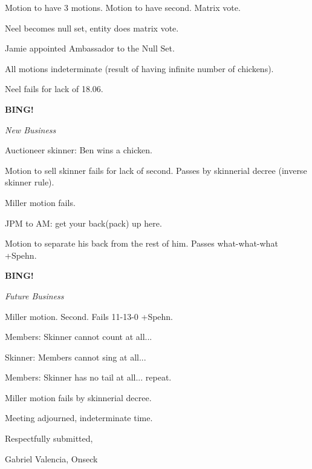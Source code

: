 \documentclass[12pt]{article}
\newcommand{\bing}{{\bf BING!} }
\newcommand{\goto}[1]{\bing \vskip 12pt \centerline{{\em{#1}}}}
\begin{document}
Motion to have 3 motions. Motion to have second. Matrix vote.

Neel becomes null set, entity does matrix vote.

Jamie appointed Ambassador to the Null Set.

All motions indeterminate (result of having infinite number of chickens).

Neel fails for lack of 18.06.

\goto{New Business}

Auctioneer skinner: Ben wins a chicken.

Motion to sell skinner fails for lack of second. Passes by skinnerial decree (inverse skinner rule).

Miller motion fails.

JPM to AM: get your back(pack) up here.

Motion to separate his back from the rest of him. Passes what-what-what +Spehn.

\goto{Future Business}

Miller motion. Second. Fails 11-13-0 +Spehn.

Members: Skinner cannot count at all...

Skinner: Members cannot sing at all...

Members: Skinner has no tail at all... repeat.

Miller motion fails by skinnerial decree.

\vspace{12pt}

\noindent
Meeting adjourned, indeterminate time.

\vspace{18pt}

\centerline{Respectfully submitted,}
\centerline{Gabriel Valencia, Onseck}
\end{document}
